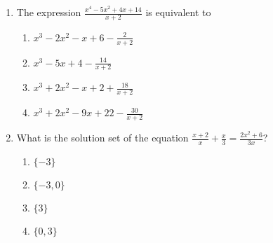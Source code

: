 \documentclass[12pt, twoside]{article}
\begin{document}
\begin{enumerate}[itemsep=0.5cm]
\item The expression $\displaystyle \frac{x^4 - 5x^2 + 4x + 14}{x+2}$ is equivalent to
\begin{enumerate}
    \item $\displaystyle x^3 - 2x^2 - x + 6 - \frac{2}{x + 2}$
    \item $\displaystyle x^3 - 5x + 4 - \frac{14}{x + 2}$
    \item $\displaystyle x^3 + 2x^2 - x + 2 + \frac{18}{x + 2}$
    \item $\displaystyle x^3 + 2x^2 - 9x + 22 - \frac{30}{x + 2}$
\end{enumerate}

\item What is the solution set of the equation \(\displaystyle \frac{x+2}{x} + \frac{x}{3} = \frac{2x^2+6}{3x}\)?
\begin{enumerate}
    \item \(\{-3\}\)
    \item \(\{-3, 0\}\)
    \item \(\{3\}\)
    \item \(\{0, 3\}\)
\end{enumerate}


\end{enumerate}
\end{document}
